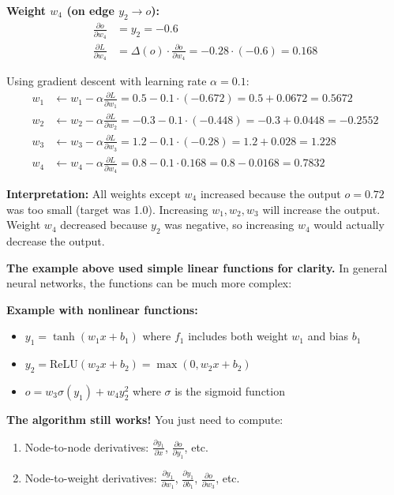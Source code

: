 \begin{notechapter}
\begin{tcolorbox}[colback=red!5,colframe=red!60,title=Step 4: Compute Weight Gradients]
\textbf{Weight $w_4$ (on edge $y_2 \to o$):}
\begin{align*}
\frac{\partial o}{\partial w_4} &= y_2 = -0.6\\
\frac{\partial L}{\partial w_4} &= \Delta(o) \cdot \frac{\partial o}{\partial w_4} = -0.28 \cdot (-0.6) = \boxed{0.168}
\end{align*}
\end{tcolorbox}

\begin{tcolorbox}[colback=yellow!10,colframe=orange,title=Step 5: Weight Update]
Using gradient descent with learning rate $\alpha = 0.1$:
\begin{align*}
w_1 &\gets w_1 - \alpha \frac{\partial L}{\partial w_1} = 0.5 - 0.1 \cdot (-0.672) = 0.5 + 0.0672 = 0.5672\\
w_2 &\gets w_2 - \alpha \frac{\partial L}{\partial w_2} = -0.3 - 0.1 \cdot (-0.448) = -0.3 + 0.0448 = -0.2552\\
w_3 &\gets w_3 - \alpha \frac{\partial L}{\partial w_3} = 1.2 - 0.1 \cdot (-0.28) = 1.2 + 0.028 = 1.228\\
w_4 &\gets w_4 - \alpha \frac{\partial L}{\partial w_4} = 0.8 - 0.1 \cdot 0.168 = 0.8 - 0.0168 = 0.7832
\end{align*}

\textbf{Interpretation:} All weights except $w_4$ increased because the output $o = 0.72$ was too small (target was 1.0). Increasing $w_1, w_2, w_3$ will increase the output. Weight $w_4$ decreased because $y_2$ was negative, so increasing $w_4$ would actually decrease the output.
\end{tcolorbox}

\begin{tcolorbox}[colback=orange!5,colframe=orange!80,title=Important: General Functions]
\textbf{The example above used simple linear functions for clarity.} In general neural networks, the functions can be much more complex:

\textbf{Example with nonlinear functions:}
\begin{itemize}
    \item $y_1 = \tanh(w_1 x + b_1)$ where $f_1$ includes both weight $w_1$ and bias $b_1$
    \item $y_2 = \text{ReLU}(w_2 x + b_2) = \max(0, w_2 x + b_2)$
    \item $o = w_3 \sigma(y_1) + w_4 y_2^2$ where $\sigma$ is the sigmoid function
\end{itemize}

\textbf{The algorithm still works!} You just need to compute:
\begin{enumerate}
    \item Node-to-node derivatives: $\frac{\partial y_1}{\partial x}$, $\frac{\partial o}{\partial y_1}$, etc.
    \item Node-to-weight derivatives: $\frac{\partial y_1}{\partial w_1}$, $\frac{\partial y_1}{\partial b_1}$, $\frac{\partial o}{\partial w_3}$, etc.
\end{enumerate}


\end{tcolorbox}
\end{notechapter}
